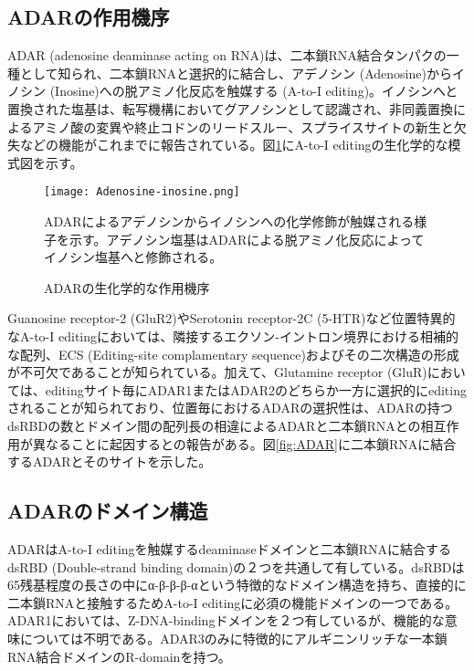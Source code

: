 \subsection{ADARの作用機序}
ADAR (adenosine deaminase acting on RNA)は、二本鎖RNA結合タンパクの一種として知られ、二本鎖RNAと選択的に結合し、アデノシン (Adenosine)からイノシン (Inosine)への脱アミノ化反応を触媒する (A-to-I editing)。イノシンへと置換された塩基は、転写機構においてグアノシンとして認識され、非同義置換によるアミノ酸の変異や終止コドンのリードスルー、スプライスサイトの新生と欠失などの機能がこれまでに報告されている。図\ref{fig:Chemical_reaction}にA-to-I editingの生化学的な模式図を示す。
\begin{figure}[htbp]
	\begin{center}
		\texttt{[image: Adenosine-inosine.png]}
	\end{center}
	\caption{ADARの生化学的な作用機序}
	\begin{flushleft}
		\small{ADARによるアデノシンからイノシンへの化学修飾が触媒される様子を示す。アデノシン塩基はADARによる脱アミノ化反応によってイノシン塩基へと修飾される。}
	\end{flushleft}
	\label{fig:Chemical_reaction}
\end{figure}

Guanosine receptor-2 (GluR2)やSerotonin receptor-2C (5-HTR)など位置特異的なA-to-I editingにおいては、隣接するエクソン-イントロン境界における相補的な配列、ECS (Editing-site complamentary sequence)およびその二次構造の形成が不可欠であることが知られている。加えて、Glutamine receptor (GluR)においては、editingサイト毎にADAR1またはADAR2のどちらか一方に選択的にeditingされることが知られており、位置毎におけるADARの選択性は、ADARの持つdsRBDの数とドメイン間の配列長の相違によるADARと二本鎖RNAとの相互作用が異なることに起因するとの報告がある。図\ref{fig:ADAR}に二本鎖RNAに結合するADARとそのサイトを示した。

\subsection{ADARのドメイン構造}
ADARはA-to-I editingを触媒するdeaminaseドメインと二本鎖RNAに結合するdsRBD (Double-strand binding domain)の２つを共通して有している。dsRBDは65残基程度の長さの中にα-β-β-β-αという特徴的なドメイン構造を持ち、直接的に二本鎖RNAと接触するためA-to-I editingに必須の機能ドメインの一つである。ADAR1においては、Z-DNA-bindingドメインを２つ有しているが、機能的な意味については不明である。ADAR3のみに特徴的にアルギニンリッチな一本鎖RNA結合ドメインのR-domainを持つ。

